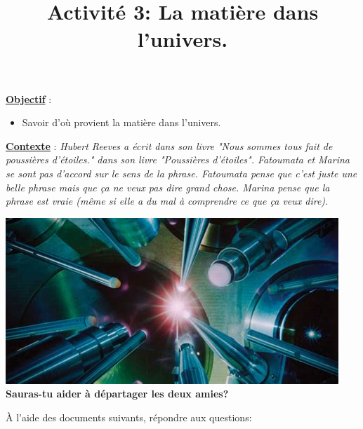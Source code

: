 \documentclass[10pt]{article}
\newcommand{\titreActivite}{\huge Activité 3: La matière dans l’univers.} %
\newcommand{\objectif}{ 	
	\begin{itemize}
		\item Savoir d'où provient la matière dans l'univers.
	\end{itemize}
} %
\newcommand{\contexte}{
	Hubert Reeves a écrit dans son livre "Nous sommes tous fait de poussières d'étoiles." dans son livre "Poussières d'étoiles".
	Fatoumata et Marina se sont pas d'accord sur le sens de la phrase. 
	Fatoumata pense que c'est juste une belle phrase mais que ça ne veux pas dire grand chose. 
	Marina pense que la phrase est vraie (même si elle a du mal à comprendre ce que ça veux dire).
}
\newcommand{\resumeContexte}{Sauras-tu aider à départager les deux amies?}
\begin{document}
\date{}
\title{\titreActivite}
\maketitle %


\underline{\textbf{Objectif}} :  \vspace{2pt}
\objectif

\vspace{4pt}



\begin{minipage}[c]{0.45\textwidth}
	\centering \underline{\textbf{Contexte}} :  \textit{\contexte}
\end{minipage}
\hspace{ 0pt}
\begin{minipage}[c]{0.45\textwidth}
	\centering \begin{center}
		\includegraphics[width=0.9\columnwidth]{act.jpeg} %
		\vspace{10pt}
		\textbf{\resumeContexte}
	\end{center}
\end{minipage}


\vspace{-12pt}


{\large À l'aide des documents suivants, répondre aux questions:}

\end{document}

